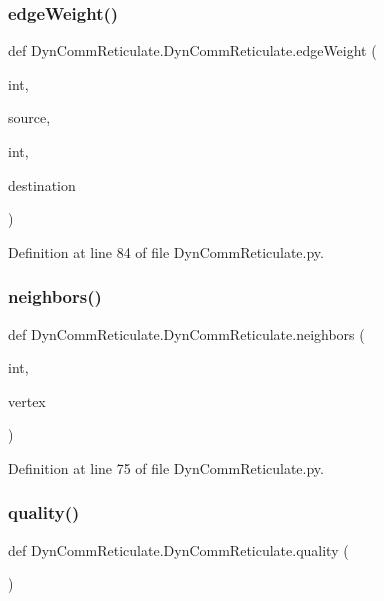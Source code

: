 \subsubsection{\texorpdfstring{edge\+Weight()}{edgeWeight()}}
{\footnotesize\ttfamily def Dyn\+Comm\+Reticulate.\+Dyn\+Comm\+Reticulate.\+edge\+Weight (\begin{DoxyParamCaption}\item[{}]{int,  }\item[{}]{source,  }\item[{}]{int,  }\item[{}]{destination }\end{DoxyParamCaption})}



Definition at line 84 of file Dyn\+Comm\+Reticulate.\+py.

\mbox{\label{classDynCommReticulate_1_1DynCommReticulate_a0c93ff179f8d4931c23ddb13af7452ef}} 
\subsubsection{\texorpdfstring{neighbors()}{neighbors()}}
{\footnotesize\ttfamily def Dyn\+Comm\+Reticulate.\+Dyn\+Comm\+Reticulate.\+neighbors (\begin{DoxyParamCaption}\item[{}]{int,  }\item[{}]{vertex }\end{DoxyParamCaption})}



Definition at line 75 of file Dyn\+Comm\+Reticulate.\+py.

\mbox{\label{classDynCommReticulate_1_1DynCommReticulate_a400176423d9d491f6cf07f1daf45eeda}} 
\subsubsection{\texorpdfstring{quality()}{quality()}}
{\footnotesize\ttfamily def Dyn\+Comm\+Reticulate.\+Dyn\+Comm\+Reticulate.\+quality (\begin{DoxyParamCaption}{ }\end{DoxyParamCaption})}



